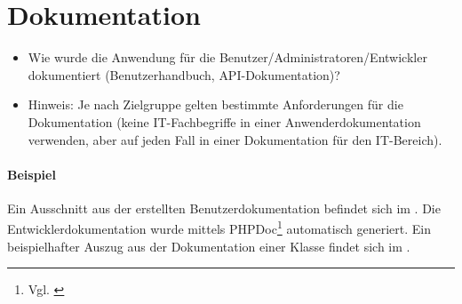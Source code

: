 \section{Dokumentation}
\label{sec:Dokumentation}

\begin{itemize}
	\item Wie wurde die Anwendung für die Benutzer/Administratoren/Entwickler dokumentiert (\zB Benutzerhandbuch, \acs{API}-Dokumentation)?
	\item Hinweis: Je nach Zielgruppe gelten bestimmte Anforderungen für die Dokumentation (\zB keine IT-Fachbegriffe in einer Anwenderdokumentation verwenden, aber auf jeden Fall in einer Dokumentation für den IT-Bereich).
\end{itemize}

\paragraph{Beispiel}
Ein Ausschnitt aus der erstellten Benutzerdokumentation befindet sich im .
Die Entwicklerdokumentation wurde mittels PHPDoc\footnote{Vgl. \cite{phpDoc}} automatisch generiert. Ein beispielhafter Auszug aus der Dokumentation einer Klasse findet sich im . 

